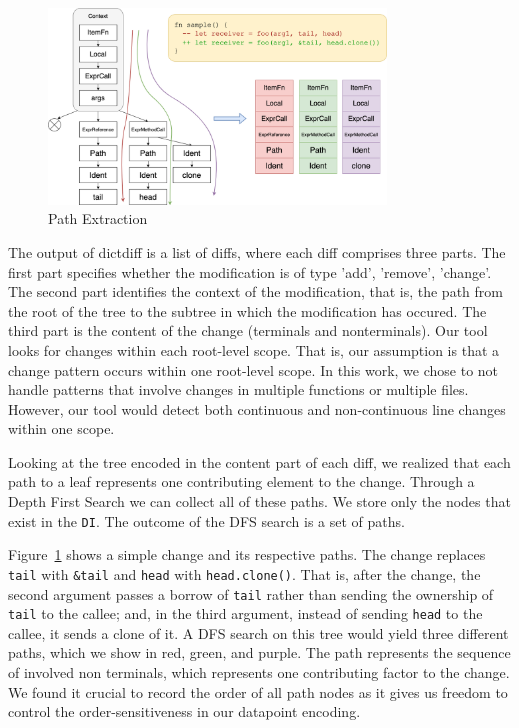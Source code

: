 \begin{figure}[h]
\centering
\includegraphics[width=0.8\textwidth]{extraction.png}
\caption{\label{fig:extraction}Path Extraction}
\end{figure}

The output of dictdiff is a list of diffs, where each diff comprises three parts. The first part specifies whether the modification is of type 'add', 'remove', 'change'. The second part identifies the context of the modification, that is, the path from the root of the tree to the subtree in which the modification has occured. The third part is the content of the change (terminals and nonterminals). Our tool looks for changes within each root-level scope. That is, our assumption is that a change pattern occurs within one root-level scope. In this work, we chose to not handle patterns that involve changes in multiple functions or multiple files. However, our tool would detect both continuous and non-continuous line changes within one scope.

Looking at the tree encoded in the content part of each diff, we realized that each path to a leaf represents one contributing element to the change. Through a Depth First Search we can collect all of these paths. We store only the nodes that exist in the \verb+DI+. The outcome of the DFS search is a set of paths.

Figure~\ref{fig:extraction} shows a simple change and its respective paths. The change replaces \verb+tail+ with \verb+&tail+ and \verb+head+ with \verb+head.clone()+. That is, after the change, the second argument passes a borrow of \verb+tail+ rather than sending the ownership of \verb+tail+ to the callee; and, in the third argument, instead of sending \verb+head+ to the callee, it sends a clone of it. A DFS search on this tree would yield three different paths, which we show in red, green, and purple. The path represents the sequence of involved non terminals, which represents one contributing factor to the change. We found it crucial to record the order of all path nodes as it gives us freedom to control the order-sensitiveness in our datapoint encoding.

